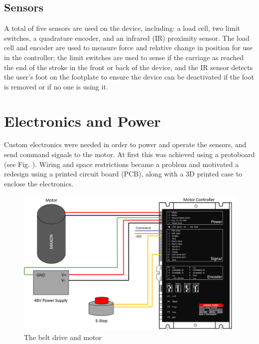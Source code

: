 \documentclass[12pt]{report}
\begin{document}
		
		\subsection{Sensors}

	A total of five sensors are used on the device, including: a load cell, two limit switches, a quadrature encoder, and an infrared (IR) proximity sensor. The load cell and encoder are used to measure force and relative change in position for use in the controller; the limit switches are used to sense if the carriage as reached the end of the stroke in the front or back of the device, and the IR sensor detects the user's foot on the footplate to ensure the device can be deactivated if the foot is removed or if no one is using it. 		
		
	\section{Electronics and Power}
	
	Custom electronics were needed in order to power and operate the sensors, and send command signals to the motor. At first this was achieved using a protoboard (see Fig. ). Wiring and space restrictions became a problem and motivated a redesign using a printed circuit board (PCB), along with a 3D printed case to enclose the electronics. 
	
		
	\begin{figure}[h] 
		\centering
		\includegraphics[width=0.9\linewidth]{Motor_setup}
		\caption{The belt drive and motor}
		\label{fig:actuator}
	\end{figure}
		
	
	
\end{document}

